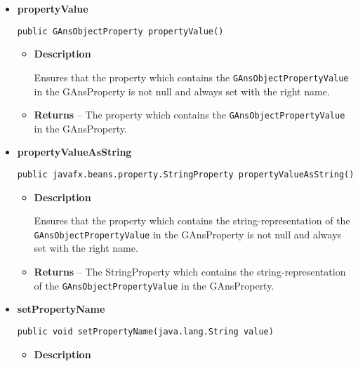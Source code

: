 {{{{{{{{{{{\begin{itemize}
{\begin{itemize}
{Ensures that the property which contains the name/identifier of the GAnsProperty is not null and always set with the right name.
}
\item{{\bf  Returns} -- 
The StringProperty which contains the name/identifier of the GAnsProperty. 
}%
\end{itemize}
}%
\item{ 
{\bf  propertyValue}\\
\begin{lstlisting}[frame=none]
public GAnsObjectProperty propertyValue()\end{lstlisting} %
\begin{itemize}
\item{
{\bf  Description}

Ensures that the property which contains the \texttt{\small GAnsObjectPropertyValue}{\small 
{}} in the GAnsProperty is not null and always set with the right name.
}
\item{{\bf  Returns} -- 
The property which contains the \texttt{\small GAnsObjectPropertyValue}{\small 
{}} in the GAnsProperty. 
}%
\end{itemize}
}%
\item{ 
{\bf  propertyValueAsString}\\
\begin{lstlisting}[frame=none]
public javafx.beans.property.StringProperty propertyValueAsString()\end{lstlisting} %
\begin{itemize}
\item{
{\bf  Description}

Ensures that the property which contains the string-representation of the \texttt{\small GAnsObjectPropertyValue}{\small 
{}} in the GAnsProperty is not null and always set with the right name.
}
\item{{\bf  Returns} -- 
The StringProperty which contains the string-representation of the \texttt{\small GAnsObjectPropertyValue}{\small 
{}} in the GAnsProperty. 
}%
\end{itemize}
}%
\item{ 
{\bf  setPropertyName}\\
\begin{lstlisting}[frame=none]
public void setPropertyName(java.lang.String value)\end{lstlisting} %
\begin{itemize}
\item{
{\bf  Description}

}
\end{itemize}}
\end{itemize}}}}}}}}}}}}
